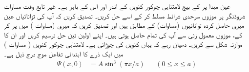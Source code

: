 عین مبدا پر  کے بیچ لامتناہی چوکور کنویں کے اندر اور اس کے باہر ہے۔ غیر تابع وقت مساوات شروڈنگر پر موزوں سرحدی شرائط مسلط کر کے اسے حل کریں۔ تصدیق کریں کہ آپ کی توانائیاں عین میری حاصل کردہ توانائیوں (مساوات) کے مطابق ہیں اور تصدیق کریں کہ میری  (مساوات ) میں  پر کر کے، موزوں معمول زنی سے آپ کی تمام  حاصل ہوتی ہیں۔ اپنے اولین تین حل ترسیم کریں اور ان کا موازنہ شکل  سے کریں۔ دھیان رہے کہ یہاں کنویں کی چوڑائی  ہے۔ 
 لامتناہی چوکور کنویں ( مساوات ) میں ایک ذرے کا ابتدائی تفاعل موج درج ذیل ہے۔
 \begin{align*}
 \Psi(x,0)&=A\sin^{3}(\pi x/a) && (0\le x\le a)
\end{align*}

